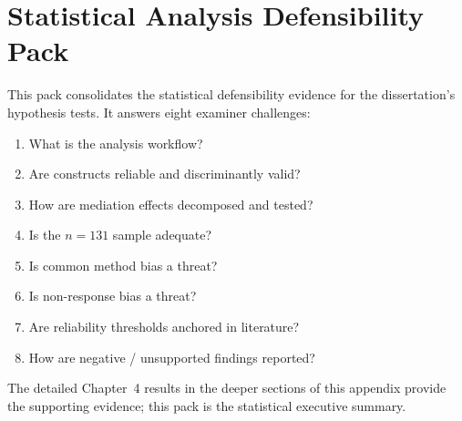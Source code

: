 \section*{Statistical Analysis Defensibility Pack}
\label{sec:stat_defensibility_pack}

\noindent This pack consolidates the statistical defensibility evidence for the dissertation's hypothesis tests. It answers eight examiner challenges:
\begin{enumerate}[leftmargin=*, itemsep=1pt, label=(\arabic*)]
    \item What is the analysis workflow?
    \item Are constructs reliable and discriminantly valid?
    \item How are mediation effects decomposed and tested?
    \item Is the $n=131$ sample adequate?
    \item Is common method bias a threat?
    \item Is non-response bias a threat?
    \item Are reliability thresholds anchored in literature?
    \item How are negative / unsupported findings reported?
\end{enumerate}
\noindent The detailed Chapter~4 results in the deeper sections of this appendix provide the supporting evidence; this pack is the statistical executive summary.


